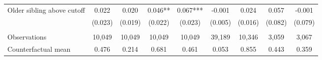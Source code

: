 {{\begin{tabular}{lcccccccc}
Older sibling above cutoff&       0.022   &       0.020   &       0.046** &       0.067***&      -0.001   &       0.024   &       0.057   &      -0.001   \\
                    &     (0.023)   &     (0.019)   &     (0.022)   &     (0.023)   &     (0.005)   &     (0.016)   &     (0.082)   &     (0.079)   \\
                    &               &               &               &               &               &               &               &               \\
Observations        &      10,049   &      10,049   &      10,049   &      10,049   &      39,189   &      10,346   &       3,059   &       3,067   \\
Counterfactual mean &       0.476   &       0.214   &       0.681   &       0.461   &       0.053   &       0.855   &       0.443   &       0.359   \\
 

\bottomrule
\end{tabular}
}
}
